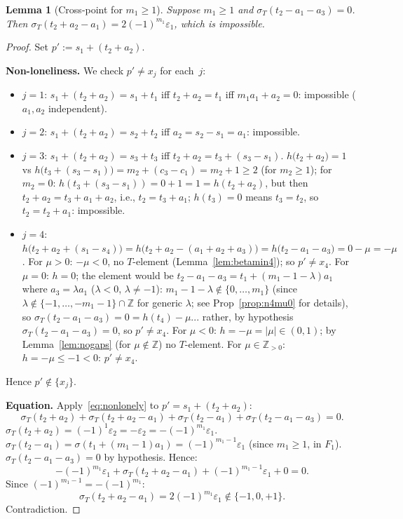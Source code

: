 \documentclass{article}
\newtheorem{lemma}{Lemma}
\begin{document}
\begin{lemma}[Cross-point for $m_1\ge 1$]\label{lem:cross}
Suppose $m_1\ge 1$ and $\sigma_T(t_2-a_1-a_3)=0$.
Then $\sigma_T(t_2+a_2-a_1)=2(-1)^{m_1}\varepsilon_1$, which is impossible.
\end{lemma}
\begin{proof}
Set $p':=s_1+(t_2+a_2)$.

\textbf{Non-loneliness.}
We check $p'\ne x_j$ for each~$j$:
\begin{itemize}
\item $j=1$: $s_1+(t_2+a_2)=s_1+t_1$ iff $t_2+a_2=t_1$ iff $m_1a_1+a_2=0$: impossible ($a_1,a_2$ independent).
\item $j=2$: $s_1+(t_2+a_2)=s_2+t_2$ iff $a_2=s_2-s_1=a_1$: impossible.
\item $j=3$: $s_1+(t_2+a_2)=s_3+t_3$ iff $t_2+a_2=t_3+(s_3-s_1)$.
  $h\bigl(t_2+a_2\bigr)=1$ vs $h\bigl(t_3+(s_3-s_1)\bigr)=m_2+(c_3-c_1)=m_2+1\ge 2$ (for $m_2\ge 1$);
  for $m_2=0$: $h(t_3+(s_3-s_1))=0+1=1=h(t_2+a_2)$, but then $t_2+a_2=t_3+a_1+a_2$, i.e., $t_2=t_3+a_1$; $h(t_3)=0$ means $t_3=t_2$, so $t_2=t_2+a_1$: impossible.
\item $j=4$: $h\bigl(t_2+a_2+(s_1-s_4)\bigr)=h\bigl(t_2+a_2-(a_1+a_2+a_3)\bigr)=h\bigl(t_2-a_1-a_3\bigr)=0-\mu=-\mu$.
  For $\mu>0$: $-\mu<0$, no $T$-element (Lemma~\ref{lem:betamin4}); so $p'\ne x_4$.
  For $\mu=0$: $h=0$; the element would be $t_2-a_1-a_3=t_1+(m_1-1-\lambda)a_1$ where $a_3=\lambda a_1$
  ($\lambda<0$, $\lambda\ne-1$): $m_1-1-\lambda\notin\{0,\dots,m_1\}$ (since $\lambda\notin\{-1,\dots,-m_1-1\}\cap\mathbb{Z}$ for generic $\lambda$; see Prop~\ref{prop:n4mu0} for details), so $\sigma_T(t_2-a_1-a_3)=0=h(t_4)-\mu$... rather, by hypothesis $\sigma_T(t_2-a_1-a_3)=0$, so $p'\ne x_4$.
  For $\mu<0$: $h=-\mu=|\mu|\in(0,1)$; by Lemma~\ref{lem:nogaps} (for $\mu\notin\mathbb{Z}$) no $T$-element.
  For $\mu\in\mathbb{Z}_{>0}$: $h=-\mu\le-1<0$: $p'\ne x_4$.
\end{itemize}
Hence $p'\notin\{x_j\}$.

\textbf{Equation.}
Apply~\eqref{eq:nonlonely} to $p'=s_1+(t_2+a_2)$:
\begin{equation}\label{eq:crosspoint}
  \sigma_T(t_2+a_2)+\sigma_T(t_2+a_2-a_1)+\sigma_T(t_2-a_1)+\sigma_T(t_2-a_1-a_3)=0.
\end{equation}
$\sigma_T(t_2+a_2)=(-1)^1\varepsilon_2=-\varepsilon_2=-(-1)^{m_1}\varepsilon_1$.
$\sigma_T(t_2-a_1)=\sigma(t_1+(m_1-1)a_1)=(-1)^{m_1-1}\varepsilon_1$ (since $m_1\ge 1$, in $F_1$).
$\sigma_T(t_2-a_1-a_3)=0$ by hypothesis.
Hence:
\[
  -(-1)^{m_1}\varepsilon_1+\sigma_T(t_2+a_2-a_1)+(-1)^{m_1-1}\varepsilon_1+0=0.
\]
Since $(-1)^{m_1-1}=-(-1)^{m_1}$:
\[
  \sigma_T(t_2+a_2-a_1)=2(-1)^{m_1}\varepsilon_1\notin\{-1,0,+1\}.
\]
Contradiction.
\end{proof}
\end{document}
